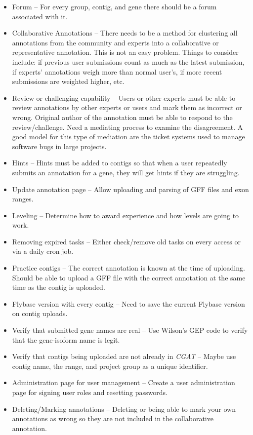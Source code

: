 \documentclass[12pt]{ucthesis}
\begin{document}
\begin{itemize}
\item Forum -- For every group, contig, and gene there should be a forum associated with it.
\item Collaborative Annotations -- There needs to be a method for clustering all annotations from the
community and experts into a collaborative or representative annotation. This is not an easy problem. Things to consider include: if previous user submissions count as much as the latest submission, if experts' annotations weigh more than normal user's, if more recent submissions are weighted higher, etc.
\item Review or challenging capability -- Users or other experts must be able to review annotations by other experts or users and mark them as incorrect or wrong. Original author of the annotation must be able to respond
to the review/challenge. Need a mediating process to examine the disagreement. A good model for this type
of mediation are the ticket systems used to manage software bugs in large projects.
\item Hints -- Hints must be added to contigs so that when a user repeatedly submits an annotation for a gene, they will get hints if they are struggling.
\item Update annotation page -- Allow uploading and parsing of GFF files and exon ranges.
\item Leveling -- Determine how to award experience and how levels are going to work.
\item Removing expired tasks -- Either check/remove old tasks on every access or via a daily cron job.
\item Practice contigs -- The correct annotation is known at the time of uploading. Should be
able to upload a GFF file with the correct annotation at the same time as the contig is uploaded.
\item Flybase version with every contig -- Need to save the current Flybase version on contig uploads.
\item Verify that submitted gene names are real -- Use Wilson's GEP code to verify that the gene-isoform name is legit.
\item Verify that contigs being uploaded are not already in \textit{CGAT} -- Maybe use contig name, the range, and
project group as a unique identifier.
\item Administration page for user management -- Create a user administration page for signing user roles and resetting passwords.
\item Deleting/Marking annotations -- Deleting or being able to mark your own annotations as wrong so they are not included in the collaborative annotation.

\end{itemize}
\end{document}
